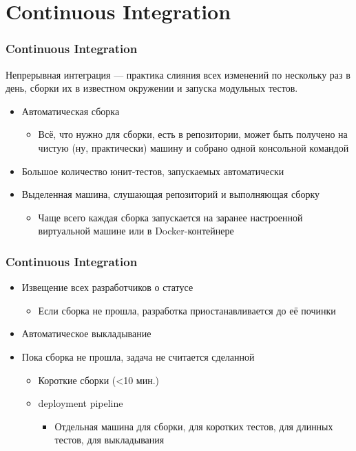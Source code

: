 \documentclass{../../slides-style}
\begin{document}
    \begin{frame}[plain]
        \titlepage
    \end{frame}

    \section{Continuous Integration}

    \begin{frame}
        \frametitle{Continuous Integration}
        Непрерывная интеграция --- практика слияния всех изменений по нескольку раз в день, сборки их в известном окружении и запуска модульных тестов.
        \begin{itemize}
            \item Автоматическая сборка
            \begin{itemize}
                \item Всё, что нужно для сборки, есть в репозитории, может быть получено на чистую (ну, практически) машину и собрано одной консольной командой
            \end{itemize}
            \item Большое количество юнит-тестов, запускаемых автоматически
            \item Выделенная машина, слушающая репозиторий и выполняющая сборку
            \begin{itemize}
                \item Чаще всего каждая сборка запускается на заранее настроенной виртуальной машине или в Docker-контейнере
            \end{itemize}
        \end{itemize}
    \end{frame}

    \begin{frame}
        \frametitle{Continuous Integration}
        \begin{itemize}
            \item Извещение всех разработчиков о статусе
            \begin{itemize}
                \item Если сборка не прошла, разработка приостанавливается до её починки
            \end{itemize}
            \item Автоматическое выкладывание
            \item Пока сборка не прошла, задача не считается сделанной
            \begin{itemize}
                \item Короткие сборки (<10 мин.)
                \item deployment pipeline
                \begin{itemize}
                    \item Отдельная машина для сборки, для коротких тестов, для длинных тестов, для выкладывания
                \end{itemize}
            \end{itemize}
        \end{itemize}
    \end{frame}
\end{document}

